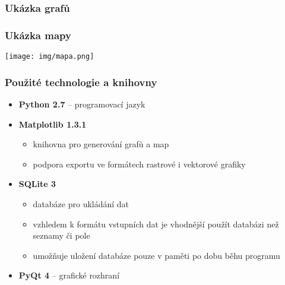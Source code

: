 \documentclass{beamer}
\begin{document}
\begin{frame}
	\frametitle{Ukázka grafů}
	\hspace*{-10mm}
\end{frame}


\begin{frame}
	\frametitle{Ukázka mapy}
	\centering
	\texttt{[image: img/mapa.png]}
\end{frame}

\begin{frame}
	\frametitle{Použité technologie a knihovny}
	\begin{itemize}
		\item \textbf{Python 2.7} -- programovací jazyk
		\item \textbf{Matplotlib 1.3.1}
			\begin{itemize}
				\item knihovna pro generování grafů a map
				\item podpora exportu ve formátech rastrové i vektorové grafiky
			\end{itemize}
		\item \textbf{SQLite 3}
			\begin{itemize}
				\item databáze pro ukládání dat
				\item vzhledem k formátu vstupních dat je vhodnější použít databázi než seznamy či pole
				\item umožňuje uložení databáze pouze v paměti po dobu běhu programu
			\end{itemize}
		\item \textbf{PyQt 4} -- grafické rozhraní
	\end{itemize}
\end{frame}

\end{document}
